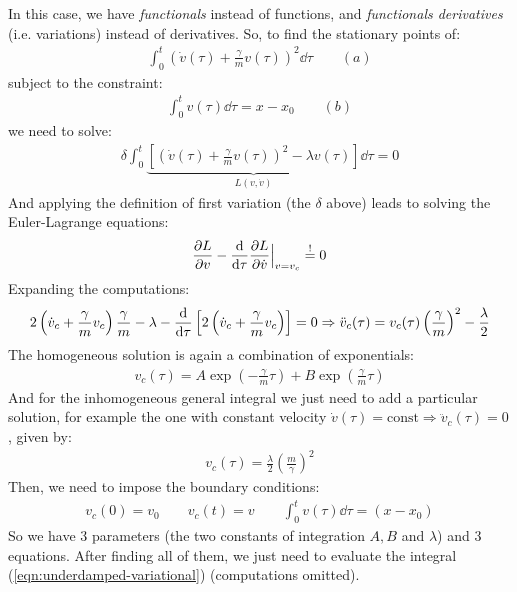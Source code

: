 \documentclass[../template.tex]{subfiles}
\begin{document}
In this case, we have \textit{functionals} instead of functions, and \textit{functionals derivatives} (i.e. variations) instead of derivatives. So, to find the stationary points of:
\begin{align*}
    \int_0^t \left(\dot{v}(\tau) + \frac{\gamma}{m} v(\tau) \right)^2 \dd{\tau} \qquad (a)
\end{align*}
subject to the constraint:
\begin{align*}
    \int_0^t v(\tau) \dd{\tau} = x - x_0\qquad (b)
\end{align*}
we need to solve:
\begin{align*}
    \delta \int_0^t \underbrace{\left[ \left(\dot{v}(\tau) + \frac{\gamma}{m} v(\tau) \right)^2 - \lambda v(\tau)\right]}_{L(v,\dot{v})}  \dd{\tau} = 0
\end{align*}
And applying the definition of first variation (the $\delta$ above) leads to solving the Euler-Lagrange equations:
\begin{align*}
    \pdv{L}{v} - \dv{\tau} \pdv{L}{\dot{v}} \Big|_{v = v_c} \overset{!}{=}  0
\end{align*} 
Expanding the computations:
\begin{align*}
    2\left(\dot{v}_c + \frac{\gamma}{m} v_c \right) \frac{\gamma}{m} - \lambda - \dv{\tau} \left[2 \left(\dot{v}_c + \frac{\gamma}{m} v_c \right)\right] = 0 \Rightarrow \ddot{v}_c(\tau) = v_c(\tau) \left(\frac{\gamma}{m} \right)^2 - \frac{\lambda}{2} 
\end{align*}
The homogeneous solution is again a combination of exponentials:
\begin{align*}
    v_c(\tau) = A \exp\left(-\frac{\gamma}{m}\tau \right) + B \exp\left(\frac{\gamma}{m} \tau \right)
\end{align*}
And for the inhomogeneous general integral we just need to add a particular solution, for example the one with constant velocity $\dot{v}(\tau) = \text{const} \Rightarrow \ddot{v}_c(\tau) = 0$, given by:
\begin{align*}
    v_c(\tau) = \frac{\lambda}{2} \left(\frac{m}{\gamma} \right)^2
\end{align*}
Then, we need to impose the boundary conditions:
\begin{align*}
    v_c(0) = v_0 \qquad v_c(t) = v\qquad \int_0^t v(\tau)\dd{\tau} = (x-x_0)
\end{align*}  
So we have $3$ parameters (the two constants of integration $A, B$ and $\lambda$) and $3$ equations. After finding all of them, we just need to evaluate the integral (\ref{eqn:underdamped-variational}) (computations omitted).
\end{document}
